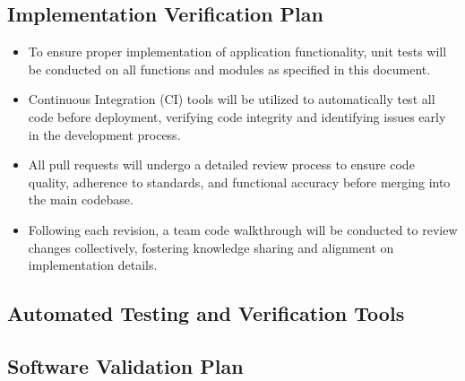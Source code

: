 \documentclass[12pt, titlepage]{article}
\begin{document}
\subsection{Implementation Verification Plan}

\begin{itemize}
  \item To ensure proper implementation of application functionality,
    unit tests will be conducted on all functions and modules as
    specified in this document.
  \item Continuous Integration (CI) tools will be utilized to
    automatically test all code before deployment, verifying code
    integrity and identifying issues early in the development process.
  \item All pull requests will undergo a detailed review process to
    ensure code quality, adherence to standards, and functional
    accuracy before merging into the main codebase.
  \item Following each revision, a team code walkthrough will be
    conducted to review changes collectively, fostering knowledge
    sharing and alignment on implementation details.
\end{itemize}

\subsection{Automated Testing and Verification Tools}




\subsection{Software Validation Plan}
\end{document}
